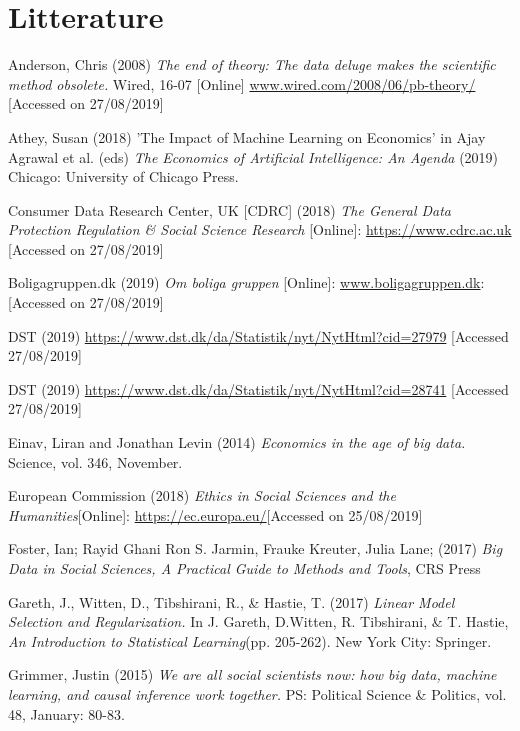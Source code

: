 \documentclass[12pt,a4paper]{article}
\begin{document}
\newpage
\section{Litterature}
Anderson, Chris (2008) \textit{The end of theory: The data deluge makes the scientific method obsolete.} Wired, 16-07 [Online] \url{www.wired.com/2008/06/pb-theory/} [Accessed on 27/08/2019]

Athey, Susan (2018) 'The Impact of Machine Learning on Economics' in Ajay Agrawal et al. (eds) \textit{The Economics of Artificial Intelligence: An Agenda} (2019) Chicago: University of Chicago Press.

Consumer Data Research Center, UK [CDRC] (2018) \textit{The General Data Protection Regulation \& Social Science Research} [Online]: \href{https://www.cdrc.ac.uk/wp-content/uploads/2018/05/6-GDPR-and-social-science-research-full-document-1.pdf}{https://www.cdrc.ac.uk} [Accessed on 27/08/2019]

Boligagruppen.dk (2019) \textit{Om boliga gruppen} [Online]: \url{www.boligagruppen.dk}: [Accessed on 27/08/2019]

DST (2019) \url{https://www.dst.dk/da/Statistik/nyt/NytHtml?cid=27979} [Accessed 27/08/2019]

DST (2019) \url{https://www.dst.dk/da/Statistik/nyt/NytHtml?cid=28741} [Accessed 27/08/2019]

Einav, Liran and Jonathan Levin (2014) \textit{Economics in the age of big data.} Science, vol. 346, November.

European Commission (2018) \textit{Ethics in Social Sciences and the Humanities}[Online]: \href{https://ec.europa.eu/research/participants/data/ref/h2020/other/hi/h2020_ethics-soc-sciencehumanities_en.pdf}{https://ec.europa.eu/}[Accessed on 25/08/2019]

Foster, Ian; Rayid Ghani Ron S. Jarmin, Frauke Kreuter, Julia Lane; (2017) \textit{Big Data in Social Sciences, A Practical Guide to Methods and Tools}, CRS Press 

Gareth, J., Witten, D., Tibshirani, R., \& Hastie, T. (2017) \textit{Linear Model Selection and Regularization.} In J. Gareth, D.Witten, R. Tibshirani, \& T. Hastie, \textit{An Introduction to Statistical Learning}(pp. 205-262). New York City: Springer.

Grimmer, Justin (2015) \textit{We are all social scientists now: how big data, machine learning, and causal inference work together.} PS: Political Science \& Politics, vol. 48, January: 80-83.
\end{document}
